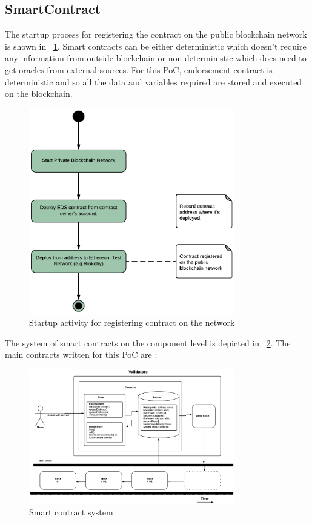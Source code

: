 \subsection{SmartContract} 
The startup process for registering the contract on the public blockchain
network is shown in ~\ref{fig:startup}. Smart contracts can be either
deterministic which doesn't require any information from outside blockchain or
non-deterministic which does need to get oracles from external sources. For
this PoC, endorsement contract is deterministic and so all the data and
variables required are stored and executed on the blockchain.

\begin{figure}
	\centering
	\includegraphics[width=0.8\textwidth]{Images/ActivityDiagramStartUpBC.eps}
	\caption{Startup activity for registering contract on the network}
	\label{fig:startup}
\end{figure}

The system of smart contracts on the component level is depicted in
~\ref{fig:smartcontracts}. The main contracts written for this PoC are : 

\begin{figure}
	\centering
	\includegraphics[width=0.8\textwidth]{Images/SmartContractsEDSMarketPlace.eps}
	\caption{Smart contract system}
	\label{fig:smartcontracts}
\end{figure}

